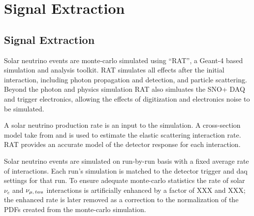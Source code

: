 
\chapter{Signal Extraction}

\ifpdf
    \graphicspath{{sigex/figures/PNG/}{sigex/figures/PDF/}{sigex/figures/}}
\else
    \graphicspath{{sigex/figures/EPS/}{sigex/figures/}}
\fi


\section{Signal Extraction}
Solar neutrino events are monte-carlo simulated using ``RAT'', a Geant-4 based
simulation and analysis toolkit.
RAT simulates all effects after the initial interaction, including photon
propagation and detection, and particle scattering.
Beyond the photon and physics simulation RAT also simluates the SNO+ DAQ and trigger electronics,
allowing the effects of digitization and electronics noise to be simulated.

A solar neutrino production rate is an input to the simulation.
A cross-section model take from \cite{bahcall} and \cite{lookitup}
is used to estimate the elastic scattering interaction rate.
RAT provides an accurate model of the detector response for each interaction.

Solar neutrino events are simulated on run-by-run basis with a fixed average rate
of interactions.
Each run's simulation is matched to the detector trigger and
daq settings for that run. To ensure adequate monte-carlo statistics the
rate of solar $\nu_{e}$ and $\nu_{\mu\text{,\,}tau}$ interactions is artificially
enhanced by a factor of XXX and XXX; the enhanced rate is later removed as a correction
to the normalization of the PDFs created from the monte-carlo simulation.

